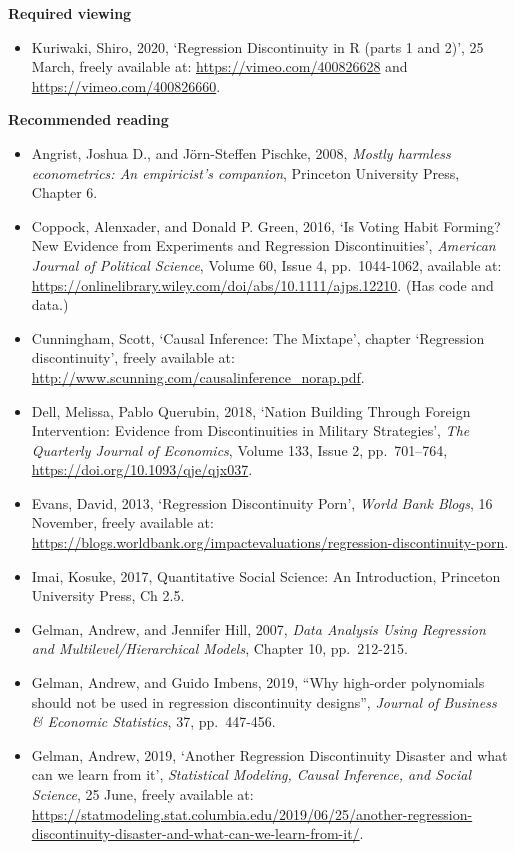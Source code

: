 \documentclass[
]{book}
\providecommand{\tightlist}{%
  \setlength{\itemsep}{0pt}\setlength{\parskip}{0pt}}
\begin{document}
\textbf{Required viewing}

\begin{itemize}
\tightlist
\item
  Kuriwaki, Shiro, 2020, `Regression Discontinuity in R (parts 1 and 2)', 25 March, freely available at: \url{https://vimeo.com/400826628} and \url{https://vimeo.com/400826660}.
\end{itemize}

\textbf{Recommended reading}

\begin{itemize}
\tightlist
\item
  Angrist, Joshua D., and Jörn-Steffen Pischke, 2008, \emph{Mostly harmless econometrics: An empiricist's companion}, Princeton University Press, Chapter 6.
\item
  Coppock, Alenxader, and Donald P. Green, 2016, `Is Voting Habit Forming? New Evidence from Experiments and Regression Discontinuities', \emph{American Journal of Political Science}, Volume 60, Issue 4, pp.~1044-1062, available at: \url{https://onlinelibrary.wiley.com/doi/abs/10.1111/ajps.12210}. (Has code and data.)
\item
  Cunningham, Scott, `Causal Inference: The Mixtape', chapter `Regression discontinuity', freely available at: \url{http://www.scunning.com/causalinference_norap.pdf}.
\item
  Dell, Melissa, Pablo Querubin, 2018, `Nation Building Through Foreign Intervention: Evidence from Discontinuities in Military Strategies', \emph{The Quarterly Journal of Economics}, Volume 133, Issue 2, pp.~701--764, \url{https://doi.org/10.1093/qje/qjx037}.
\item
  Evans, David, 2013, `Regression Discontinuity Porn', \emph{World Bank Blogs}, 16 November, freely available at: \url{https://blogs.worldbank.org/impactevaluations/regression-discontinuity-porn}.
\item
  Imai, Kosuke, 2017, Quantitative Social Science: An Introduction, Princeton University Press, Ch 2.5.
\item
  Gelman, Andrew, and Jennifer Hill, 2007, \emph{Data Analysis Using Regression and Multilevel/Hierarchical Models}, Chapter 10, pp.~212-215.
\item
  Gelman, Andrew, and Guido Imbens, 2019, ``Why high-order polynomials should not be used in regression discontinuity designs'', \emph{Journal of Business \& Economic Statistics}, 37, pp.~447-456.
\item
  Gelman, Andrew, 2019, `Another Regression Discontinuity Disaster and what can we learn from it', \emph{Statistical Modeling, Causal Inference, and Social Science}, 25 June, freely available at: \url{https://statmodeling.stat.columbia.edu/2019/06/25/another-regression-discontinuity-disaster-and-what-can-we-learn-from-it/}.

\end{itemize}
\end{document}
